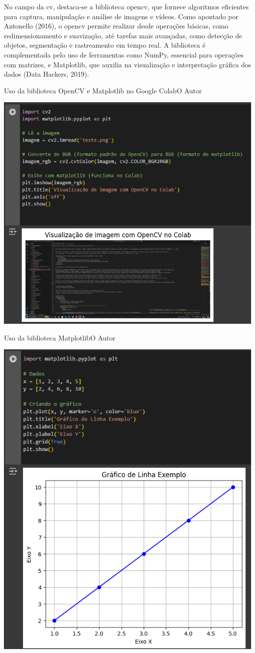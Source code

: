No campo da \ac{cv}, destaca-se a biblioteca \ac{opencv}, que fornece algoritmos eficientes para captura, manipulação e análise de imagens e vídeos. Como apontado por Antonello (2016), 
o \ac{opencv} permite realizar desde operações básicas, como redimensionamento e suavização, até tarefas mais avançadas, como detecção de objetos, segmentação e rastreamento em tempo real. 
A biblioteca é complementada pelo uso de ferramentas como NumPy, essencial para operações com matrizes, e Matplotlib, que auxilia na visualização e interpretação gráfica dos dados (Data Hackers, 2019).

\begin{figura}{Uso da biblioteca OpenCV e Matplotlib no Google Colab}{O Autor}
    \begin{flushleft}
        \label{fig:opencv-colab}
        \includegraphics[width=0.60\linewidth]{resources/floats/ilustracoes/opencv.png}
    \end{flushleft}
\end{figura}
\FloatBarrier

\begin{figura}{Uso da biblioteca Matplotlib}{O Autor}
    \begin{flushleft}
        \label{fig:matplotlib-exemplo}
        \includegraphics[width=0.48\linewidth]{resources/floats/ilustracoes/matplotlib.png}
    \end{flushleft}
\end{figura}
\FloatBarrier

